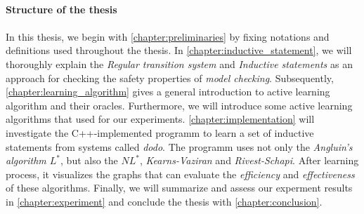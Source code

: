 \paragraph*{Structure of the thesis}
\paragraph*{}

In this thesis, we begin with \autoref{chapter:preliminaries} by fixing notations and 
definitions used throughout the thesis.
In \autoref{chapter:inductive_statement}, we will thoroughly explain the
\textit{Regular transition system} and \textit{Inductive statements} as an approach 
for checking the safety properties of \textit{model checking}. 
Subsequently, \autoref{chapter:learning_algorithm} gives a general introduction
to active learning algorithm and their oracles.
Furthermore, we will introduce some active learning algorithms that used 
for our experiments.
\autoref{chapter:implementation} will investigate the C++-implemented programm to
learn a set of inductive statements from systems called \textit{dodo}. 
The programm uses not only the \textit{Angluin's algorithm $L^*$}, but also 
the \textit{$NL^*$}, \textit{Kearns-Vaziran} and \textit{Rivest-Schapi}.
After learning process, it visualizes the graphs that can evaluate 
the \textit{efficiency} and \textit{effectiveness} of these algorithms.
Finally, we will summarize and assess our experment results in \autoref{chapter:experiment} 
and conclude the thesis with \autoref{chapter:conclusion}.